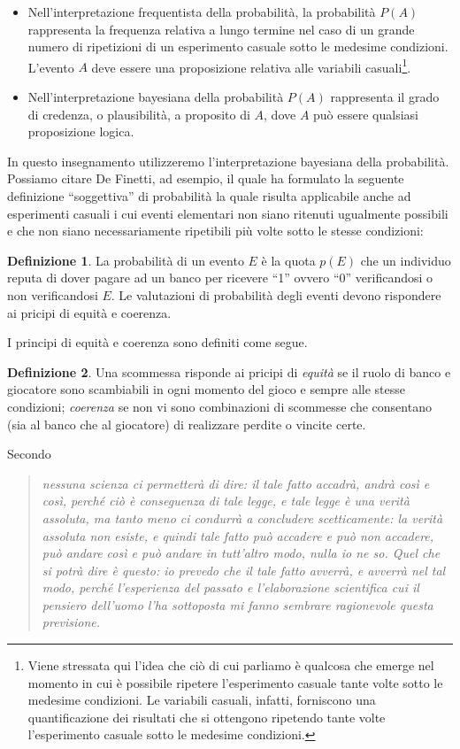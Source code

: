 \documentclass[
  10pt,
  italian,
  a4paper,
  extrafontsizes,onecolumn,openright
  ]{memoir}
\theoremstyle{definition}
\newtheorem{definition}{Definizione}[chapter]
\theoremstyle{definition}
\theoremstyle{definition}
\theoremstyle{definition}
\theoremstyle{remark}
\begin{document}
\begin{itemize}
\item
  Nell'interpretazione frequentista della probabilità, la probabilità \(P(A)\) rappresenta la frequenza relativa a lungo termine nel caso di un grande numero di ripetizioni di un esperimento casuale sotto le medesime condizioni. L'evento \(A\) deve essere una proposizione relativa alle variabili casuali\footnote{Viene stressata qui l'idea che ciò di cui parliamo è qualcosa che emerge nel momento in cui è possibile ripetere l'esperimento casuale tante volte sotto le medesime condizioni. Le variabili casuali, infatti, forniscono una quantificazione dei risultati che si ottengono ripetendo tante volte l'esperimento casuale sotto le medesime condizioni.}.
\item
  Nell'interpretazione bayesiana della probabilità \(P(A)\) rappresenta il grado di credenza, o plausibilità, a proposito di \(A\), dove \(A\) può essere qualsiasi proposizione logica.
\end{itemize}

In questo insegnamento utilizzeremo l'interpretazione bayesiana della probabilità. Possiamo citare De Finetti, ad esempio, il quale ha formulato la seguente definizione ``soggettiva'' di probabilità la quale risulta applicabile anche ad esperimenti casuali i cui eventi elementari non siano ritenuti ugualmente possibili e che non siano necessariamente ripetibili più volte sotto le stesse condizioni:

\begin{definition}
La probabilità di un evento \(E\) è la quota \(p(E)\) che un individuo reputa di dover pagare ad un banco per ricevere ``1'' ovvero ``0'' verificandosi o non verificandosi \(E\). Le valutazioni di probabilità degli eventi devono rispondere ai pricipi di equità e coerenza.
\end{definition}

I principi di equità e coerenza sono definiti come segue.

\begin{definition}
Una scommessa risponde ai pricipi di \emph{equità} se il ruolo di banco e giocatore sono scambiabili in ogni momento del gioco e sempre alle stesse condizioni; \emph{coerenza} se non vi sono combinazioni di scommesse che consentano (sia al banco che al giocatore) di realizzare perdite o vincite certe.
\end{definition}

Secondo \textcite{definetti1931prob}

\begin{quote}
\emph{nessuna scienza ci permetterà di dire: il tale fatto accadrà, andrà così e così, perché ciò è conseguenza di tale legge, e tale legge è una verità assoluta, ma tanto meno ci condurrà a concludere scetticamente: la verità assoluta non esiste, e quindi tale fatto può accadere e può non accadere, può andare così e può andare in tutt'altro modo, nulla io ne so. Quel che si potrà dire è questo: io prevedo che il tale fatto avverrà, e avverrà nel tal modo, perché l'esperienza del passato e l'elaborazione scientifica cui il pensiero dell'uomo l'ha sottoposta mi fanno sembrare ragionevole questa previsione.}
\end{quote}
\end{document}
